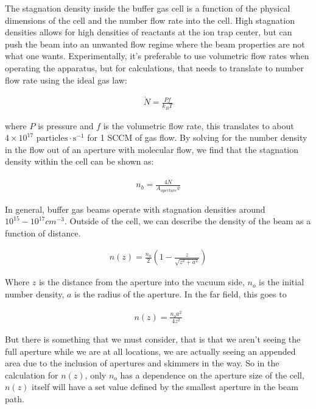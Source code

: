 \documentclass[a4paper]{article}
\begin{document}
The stagnation density inside the buffer gas cell is a function of the physical dimensions of the cell and the number flow rate into the cell. High stagnation densities allows for high densities of reactants at the ion trap center, but can push the beam into an unwanted flow regime where the beam properties are not what one wants. Experimentally, it's preferable to use volumetric flow rates when operating the apparatus, but for calculations, that needs to translate to number flow rate using the ideal gas law:

\begin{align}
\dot{N} = \frac{P f}{k_B T}
\end{align}

where $P$ is pressure and $f$ is the volumetric flow rate, this translates to about $4\times10^{17} \text{ particles} \cdot \text{s}^{-1}$ for 1 SCCM of gas flow. By solving for the number density in the flow out of an aperture with molecular flow, we find that the stagnation density within the cell can be shown as:

\begin{align}
n_{b}=\frac{4 \dot{N}}{A_{aperture} \bar{v}}
\end{align}

In general, buffer gas beams operate with stagnation densities around $10^{15}-10^{17} cm^{-3}$. Outside of the cell, we can describe the density of the beam as a function of distance. \cite{Pauly}

\begin{align}
n(z)=\frac{n_o}{2}\left(1-\frac{z}{\sqrt{z^2+a^2}}\right)
\end{align}

Where $z$ is the distance from the aperture into the vacuum side, $n_o$ is the initial number density, $a$ is the radius of the aperture. In the far field, this goes to

\begin{align}
n(z)=\frac{n_o a^2}{4 z^2}
\end{align}

But there is something that we must consider, that is that we aren't seeing the full aperture while we are at all locations, we are actually seeing an appended area due to the inclusion of apertures and skimmers in the way. So in the calculation for $n(z)$, only $n_o$ has a dependence on the aperture size of the cell, $n(z)$ itself will have a set value defined by the smallest aperture in the beam path.
\end{document}
